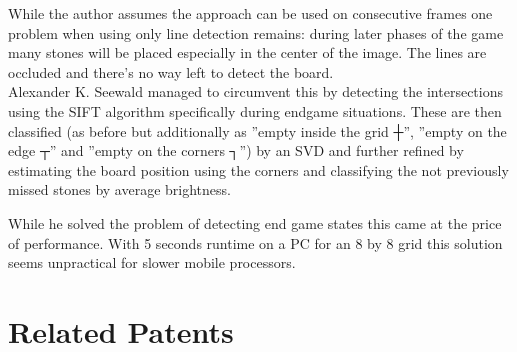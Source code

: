	While the author assumes the approach can be used on consecutive frames one problem when using only line detection remains: during later phases of the game many stones will be placed especially in the center of the image. The lines are occluded and there's no way left to detect the board.
	\\

	Alexander K. Seewald \cite{seewald2010automatic} managed to circumvent this by detecting the intersections using the SIFT algorithm specifically during endgame situations. These are then classified (as before but additionally as ''empty inside the grid ┼'', ''empty on the edge ┬'' and ''empty on the corners ┐'') by an SVD and further refined by estimating the board position using the corners and classifying the not previously missed stones by average brightness.

	While he solved the problem of detecting end game states this came at the price of performance. With 5 seconds runtime on a PC for an 8 by 8 grid this solution seems unpractical for slower mobile processors.

	\section{Related Patents}

